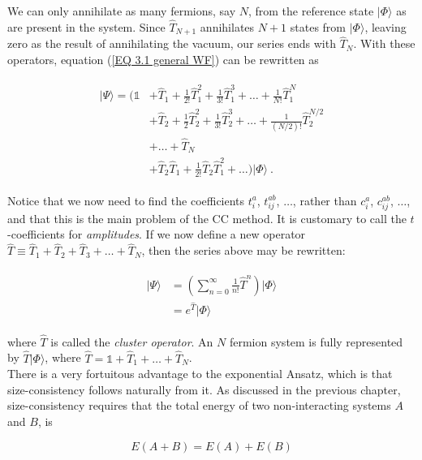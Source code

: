 \documentclass[10pt,twoside]{report}
\begin{document}
	We can only annihilate as many fermions, say $N$, from the reference state $|\Phi\rangle$ as are present in the system. Since $\hat{T}_{N+1}$ annihilates $N+1$ states from $|\Phi\rangle$, leaving zero as the result of annihilating the vacuum, our series ends with $\hat{T}_N$. With these operators, equation (\ref{EQ 3.1 general WF}) can be rewritten as
	
	\begin{align}
		\begin{split}
		|\Psi\rangle = \Big(\mathds{1} &+ \hat{T}_1 + \frac{1}{2!}\hat{T}_1^2 + \frac{1}{3!}\hat{T}_1^3 + \ldots + \frac{1}{N!}\hat{T}_1^N\\
		&+ \hat{T}_2 + \frac{1}{2}\hat{T}_2^2 + \frac{1}{3!}\hat{T}_2^3 + \ldots + \frac{1}{(N/2)!}\hat{T}_2^{N/2}\\
		&+ \ldots + \hat{T}_N \\
		&+ \hat{T}_2\hat{T}_1 + \frac{1}{2!}\hat{T}_2\hat{T}_1^2 + \ldots\Big)|\Phi\rangle \:.
		\end{split}
	\end{align}
	
	Notice that we now need to find the coefficients $t_i^a$, $t_{ij}^{ab}$, $\ldots$, rather than $c_i^a$, $c_{ij}^{ab}$, $\ldots$, and that this is the main problem of the CC method. It is customary to call the $t$-coefficients for \emph{amplitudes}. If we now define a new operator $\hat{T} \equiv \hat{T}_1 + \hat{T}_2 + \hat{T}_3 + \ldots + \hat{T}_N$, then the series above may be rewritten:
	
	\begin{align}
		\begin{split}
		|\Psi\rangle &= \left(\sum_{n=0}^\infty \frac{1}{n!}\hat{T}^n\right)|\Phi\rangle\\
		&= e^{\hat{T}}|\Phi\rangle
		\end{split}
	\end{align}
	
	\noindent where $\hat{T}$ is called the \emph{cluster operator}. An $N$ fermion system is fully represented by $\hat{T}|\Phi\rangle$, where $\hat{T} = \mathds{1} + \hat{T}_1 +\ldots+\hat{T}_N$.\\
	
	There is a very fortuitous advantage to the exponential Ansatz, which is that size-consistency follows naturally from it. As discussed in the previous chapter, size-consistency requires that the total energy of two non-interacting systems $A$ and $B$, is
	
	\begin{equation}
		E(A+B) = E(A) + E(B)
	\end{equation}
	
\end{document}

